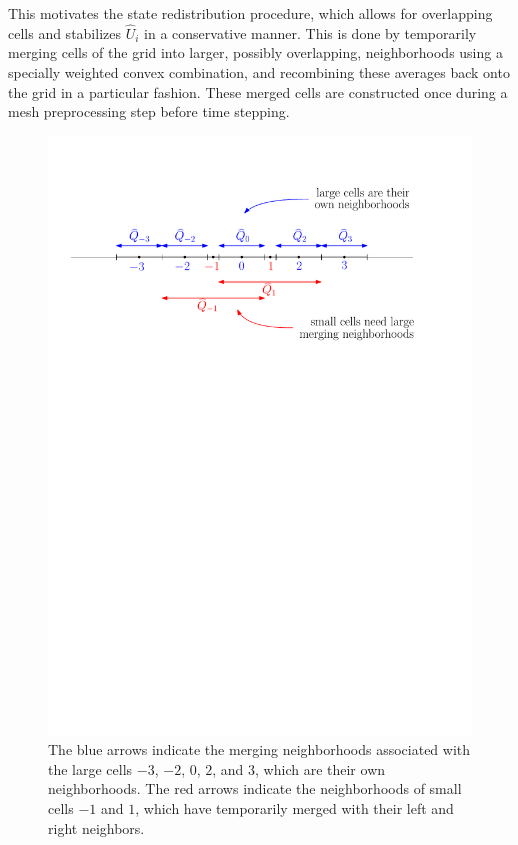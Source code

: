 This motivates the state redistribution
procedure, which allows for overlapping cells and stabilizes 
$\widehat{U}_i$ in a conservative manner.
This is done by temporarily merging cells of the grid into 
larger, possibly overlapping, neighborhoods using a specially weighted 
convex combination, and recombining these averages back onto the
grid in a particular fashion.  These merged cells are 
constructed once during a mesh preprocessing step before time stepping.

\begin{figure}[h]
\begin{center}
\vspace*{.1in}
\includegraphics[width=0.75\linewidth]{figs/overlapping1.pdf} 
\caption{\sf 
The blue arrows indicate the merging neighborhoods associated with the large 
cells $-3$, $-2$, $0$, $2$, and $3$, which are their own neighborhoods.  
The red arrows indicate the neighborhoods of small cells $-1$ and $1$, which
have temporarily merged with their left and right neighbors.  
\label{fig:mn1}}
\end{center}
\end{figure}

